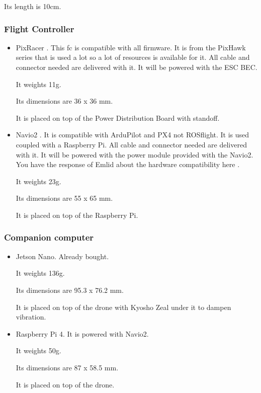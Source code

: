 Its length is 10cm.

\subsubsection{Flight Controller}
\begin{itemize}
    \item PixRacer \cite{mrobotics_pixracer}. This \gls{fc} is compatible with all firmware. It is from the PixHawk series that is used a lot so a lot of resources is available for it. All cable and connector needed are delivered with it. It will be powered with the ESC BEC.

          It weights 11g.

          Its dimensions are 36 x 36 mm.

          It is placed on top of the Power Distribution Board with standoff.

    \item Navio2 \cite{emlid_navio2}. It is compatible with ArduPilot and PX4 not ROSflight. It is used coupled with a Raspberry Pi. All cable and connector needed are delivered with it. It will be powered with the power module \cite{emlid_power_module} provided with the Navio2. You have the response of Emlid about the hardware compatibility here \cite{emlid_rpi_compatibility}.

          It weights 23g.

          Its dimensions are 55 x 65 mm.

          It is placed on top of the Raspberry Pi.
\end{itemize}

\subsubsection{Companion computer}
\begin{itemize}
    \item Jetson Nano. Already bought.

          It weights 136g.

          Its dimensions are 95.3 x 76.2 mm.

          It is placed on top of the drone with Kyosho Zeal under it to dampen vibration.

    \item Raspberry Pi 4. It is powered with Navio2.

          It weights 50g.

          Its dimensions are 87 x 58.5 mm.

          It is placed on top of the drone.
\end{itemize}

